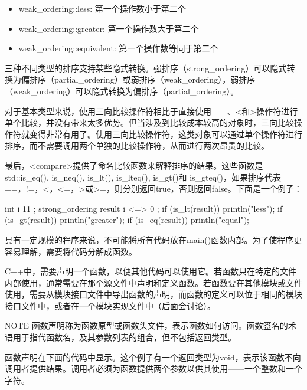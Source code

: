 \begin{itemize}
\item
weak\_ordering::less: 第一个操作数小于第二个

\item
weak\_ordering::greater: 第一个操作数大于第二个

\item
weak\_ordering::equivalent: 第一个操作数等同于第二个
\end{itemize}

三种不同类型的排序支持某些隐式转换。强排序（strong\_ordering）可以隐式转换为偏排序（partial\_ordering）或弱排序（weak\_ordering），弱排序（weak\_ordering）可以隐式转换为偏排序（partial\_ordering）。

对于基本类型来说，使用三向比较操作符相比于直接使用 ==、<和>操作符进行单个比较，并没有带来太多优势。但当涉及到比较成本较高的对象时，三向比较操作符就变得非常有用了。使用三向比较操作符，这类对象可以通过单个操作符进行排序，而不需要调用两个单独的比较操作符，从而进行两次昂贵的比较。

最后，<compare>提供了命名比较函数来解释排序的结果。这些函数是std::is\_eq(), is\_neq(), is\_lt(), is\_lteq(), is\_gt()和 is\_gteq()，如果排序代表==，!=，<，<=，>或>=，则分别返回true，否则返回false。下面是一个例子：

\begin{cpp}
int i { 11 };
strong_ordering result { i <=> 0 };
if (is_lt(result)) { println("less"); }
if (is_gt(result)) { println("greater"); }
if (is_eq(result)) { println("equal"); }
\end{cpp}


具有一定规模的程序来说，不可能将所有代码放在main()函数内部。为了使程序更容易理解，需要将代码分解成函数。

C++中，需要声明一个函数，以便其他代码可以使用它。若函数只在特定的文件内部使用，通常需要在那个源文件中声明和定义函数。若函数要在其他模块或文件使用，需要从模块接口文件中导出函数的声明，而函数的定义可以位于相同的模块接口文件中，或者在一个模块实现文件中（后面会讨论）。

\begin{myNotic}{NOTE}
函数声明称为函数原型或函数头文件，表示函数如何访问。函数签名的术语用于指代函数名，及其参数列表的组合，但不包括返回类型。
\end{myNotic}

函数声明在下面的代码中显示。这个例子有一个返回类型为void，表示该函数不向调用者提供结果。调用者必须为函数提供两个参数以供其使用——一个整数和一个字符。


